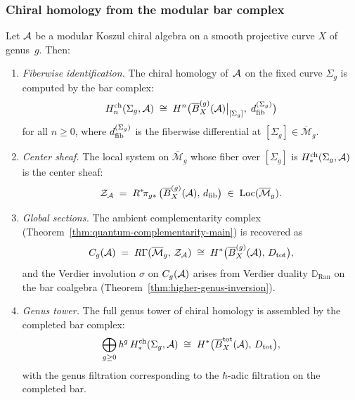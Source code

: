 \subsubsection{Chiral homology from the modular bar complex}
\label{subsubsec:chiral-homology-recovery}

\begin{theorem}\label{thm:chiral-homology-recovery}
Let $\mathcal{A}$ be a modular Koszul chiral algebra on a smooth projective
curve $X$ of genus~$g$.  Then:
\begin{enumerate}[label=\textup{(\roman*)}]
\item \emph{Fiberwise identification.}
  The chiral homology of~$\mathcal{A}$ on the fixed curve $\Sigma_g$ is
  computed by the bar complex:
  \begin{equation}\label{eq:chiral-homology-bar}
  H^{\mathrm{ch}}_n(\Sigma_g, \mathcal{A})
  \;\cong\;
  H^n\bigl(\overline{B}^{(g)}_X(\mathcal{A})\big|_{[\Sigma_g]},\;
  d_{\mathrm{fib}}^{(\Sigma_g)}\bigr)
  \end{equation}
  for all $n \geq 0$, where $d_{\mathrm{fib}}^{(\Sigma_g)}$ is the fiberwise
  differential at $[\Sigma_g] \in \overline{\mathcal{M}}_g$.

\item \emph{Center sheaf.}
  The local system on $\overline{\mathcal{M}}_g$ whose fiber
  over $[\Sigma_g]$ is $H^{\mathrm{ch}}_*(\Sigma_g, \mathcal{A})$ is the
  center sheaf:
  \begin{equation}\label{eq:center-sheaf-bar}
  \mathcal{Z}_{\mathcal{A}}
  \;=\;
  R^*\!\pi_{g*}\,
  \bigl(\overline{B}^{(g)}_X(\mathcal{A}),\, d_{\mathrm{fib}}\bigr)
  \;\in\;
  \operatorname{Loc}(\overline{\mathcal{M}}_g).
  \end{equation}

\item \emph{Global sections.}
  The ambient complementarity complex
  \textup{(}Theorem~\textup{\ref{thm:quantum-complementarity-main})}
  is recovered as
  \begin{equation}\label{eq:ambient-from-bar}
  C_g(\mathcal{A}) \;=\; R\Gamma(\overline{\mathcal{M}}_g,\,
  \mathcal{Z}_{\mathcal{A}})
  \;\cong\;
  H^*\bigl(\overline{B}^{(g)}_X(\mathcal{A}),\, D_{\mathrm{tot}}\bigr),
  \end{equation}
  and the Verdier involution $\sigma$ on $C_g(\mathcal{A})$ arises from
  Verdier duality $\mathbb{D}_{\operatorname{Ran}}$ on the bar
  coalgebra
  \textup{(}Theorem~\textup{\ref{thm:higher-genus-inversion})}.

\item \emph{Genus tower.}
  The full genus tower of chiral homology is assembled by the
  completed bar complex:
  \begin{equation}\label{eq:chiral-homology-tower}
  \bigoplus_{g \geq 0} \hbar^{g}\,
  H^{\mathrm{ch}}_*(\Sigma_g, \mathcal{A})
  \;\cong\;
  H^*\bigl(\overline{B}^{\mathrm{tot}}_X(\mathcal{A}),\, D_{\mathrm{tot}}\bigr),
  \end{equation}
  with the genus filtration corresponding to the $\hbar$-adic
  filtration on the completed bar.
\end{enumerate}
\end{theorem}

